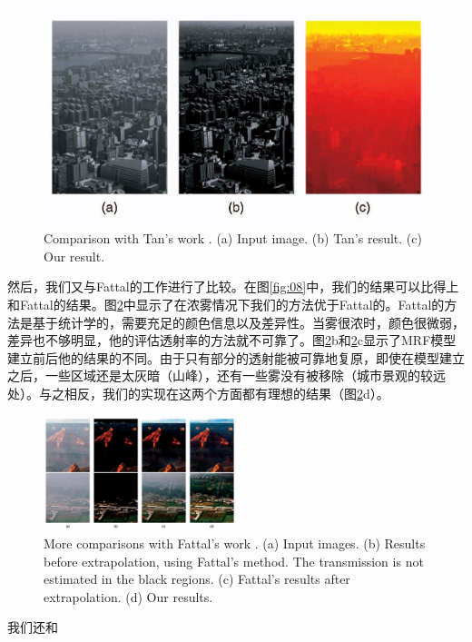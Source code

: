 \documentclass{ctexart}
\begin{document}
\begin{figure}[tbp]
	\centering
	\includegraphics[width=\textwidth]{img/14.jpg}
	\caption{Comparison with Tan’s work \cite{Tan2008}. (a) Input image. (b) Tan’s result. (c) Our result.}\label{fig:14}
\end{figure}

然后，我们又与Fattal的工作进行了比较。在图\ref{fig:08}中，我们的结果可以比得上和Fattal的结果。图\ref{fig:15}中显示了在浓雾情况下我们的方法优于Fattal的。Fattal的方法是基于统计学的，需要充足的颜色信息以及差异性。当雾很浓时，颜色很微弱，差异也不够明显，他的评估透射率的方法就不可靠了。图\ref{fig:15}b和\ref{fig:15}c显示了MRF模型建立前后他的结果的不同。由于只有部分的透射能被可靠地复原，即使在模型建立之后，一些区域还是太灰暗（山峰），还有一些雾没有被移除（城市景观的较远处）。与之相反，我们的实现在这两个方面都有理想的结果（图\ref{fig:15}d）。\par

\begin{figure}[tbp]
	\centering
	\includegraphics[width=0.5\textwidth]{img/15.jpg}
	\caption{More comparisons with Fattal’s work \cite{Fattal2008}. (a) Input images. (b) Results before extrapolation, using Fattal’s method. The transmission is not estimated in the black regions. (c) Fattal’s results after extrapolation. (d) Our results.}\label{fig:15}
\end{figure}

我们还和
\end{document}
